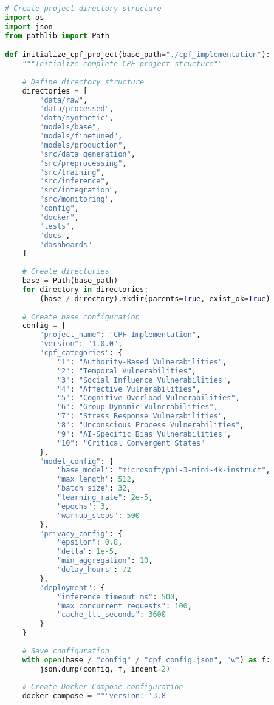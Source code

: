 \documentclass[11pt,a4paper]{article}
\begin{document}
\begin{lstlisting}[language=Python, caption=Project Structure and Initial Setup]
# Create project directory structure
import os
import json
from pathlib import Path

def initialize_cpf_project(base_path="./cpf_implementation"):
    """Initialize complete CPF project structure"""
    
    # Define directory structure
    directories = [
        "data/raw",
        "data/processed", 
        "data/synthetic",
        "models/base",
        "models/finetuned",
        "models/production",
        "src/data_generation",
        "src/preprocessing",
        "src/training",
        "src/inference",
        "src/integration",
        "src/monitoring",
        "config",
        "docker",
        "tests",
        "docs",
        "dashboards"
    ]
    
    # Create directories
    base = Path(base_path)
    for directory in directories:
        (base / directory).mkdir(parents=True, exist_ok=True)
    
    # Create base configuration
    config = {
        "project_name": "CPF Implementation",
        "version": "1.0.0",
        "cpf_categories": {
            "1": "Authority-Based Vulnerabilities",
            "2": "Temporal Vulnerabilities",
            "3": "Social Influence Vulnerabilities",
            "4": "Affective Vulnerabilities",
            "5": "Cognitive Overload Vulnerabilities",
            "6": "Group Dynamic Vulnerabilities",
            "7": "Stress Response Vulnerabilities",
            "8": "Unconscious Process Vulnerabilities",
            "9": "AI-Specific Bias Vulnerabilities",
            "10": "Critical Convergent States"
        },
        "model_config": {
            "base_model": "microsoft/phi-3-mini-4k-instruct",
            "max_length": 512,
            "batch_size": 32,
            "learning_rate": 2e-5,
            "epochs": 3,
            "warmup_steps": 500
        },
        "privacy_config": {
            "epsilon": 0.8,
            "delta": 1e-5,
            "min_aggregation": 10,
            "delay_hours": 72
        },
        "deployment": {
            "inference_timeout_ms": 500,
            "max_concurrent_requests": 100,
            "cache_ttl_seconds": 3600
        }
    }
    
    # Save configuration
    with open(base / "config" / "cpf_config.json", "w") as f:
        json.dump(config, f, indent=2)
    
    # Create Docker Compose configuration
    docker_compose = """version: '3.8'


\end{lstlisting}
\end{document}

